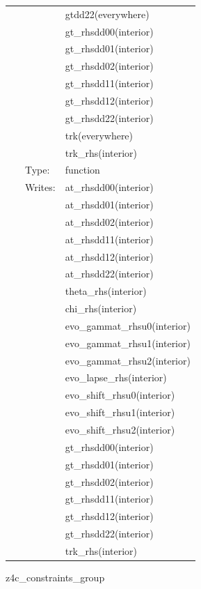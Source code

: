 \documentclass{article}
\begin{document}
\begin{tabular*}{160mm}{cll}
~& ~ &gtdd22(everywhere)\\ 
~& ~ &gt\_rhsdd00(interior)\\ 
~& ~ &gt\_rhsdd01(interior)\\ 
~& ~ &gt\_rhsdd02(interior)\\ 
~& ~ &gt\_rhsdd11(interior)\\ 
~& ~ &gt\_rhsdd12(interior)\\ 
~& ~ &gt\_rhsdd22(interior)\\ 
~& ~ &trk(everywhere)\\ 
~& ~ &trk\_rhs(interior)\\ 
~ & Type:  & function \\ 
~ & Writes:  & at\_rhsdd00(interior) \\ 
~& ~ &at\_rhsdd01(interior)\\ 
~& ~ &at\_rhsdd02(interior)\\ 
~& ~ &at\_rhsdd11(interior)\\ 
~& ~ &at\_rhsdd12(interior)\\ 
~& ~ &at\_rhsdd22(interior)\\ 
~& ~ &theta\_rhs(interior)\\ 
~& ~ &chi\_rhs(interior)\\ 
~& ~ &evo\_gammat\_rhsu0(interior)\\ 
~& ~ &evo\_gammat\_rhsu1(interior)\\ 
~& ~ &evo\_gammat\_rhsu2(interior)\\ 
~& ~ &evo\_lapse\_rhs(interior)\\ 
~& ~ &evo\_shift\_rhsu0(interior)\\ 
~& ~ &evo\_shift\_rhsu1(interior)\\ 
~& ~ &evo\_shift\_rhsu2(interior)\\ 
~& ~ &gt\_rhsdd00(interior)\\ 
~& ~ &gt\_rhsdd01(interior)\\ 
~& ~ &gt\_rhsdd02(interior)\\ 
~& ~ &gt\_rhsdd11(interior)\\ 
~& ~ &gt\_rhsdd12(interior)\\ 
~& ~ &gt\_rhsdd22(interior)\\ 
~& ~ &trk\_rhs(interior)\\ 
\end{tabular*} 


\vspace{5mm}


\hspace{5mm} z4c\_constraints\_group 
\end{document}
